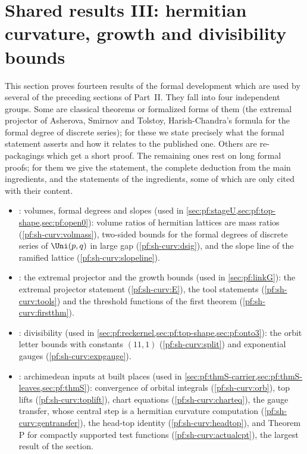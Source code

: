 \section{Shared results III: hermitian curvature, growth and divisibility bounds}\label{sec:pf:sh-curv}

\providecommand{\shcurvDs}{d_\sigma}
\providecommand{\shcurvDt}{d_\tau}
\providecommand{\shcurvGap}{h_0}
\providecommand{\shcurvRam}{\mathrm{ram}}
\providecommand{\shcurvPP}{\mathsf P}
\providecommand{\shcurvNm}{\mathfrak n^-}

This section proves fourteen results of the formal development \cite{LeanSource2026} which are used by several of the
preceding sections of Part~II. They fall into four independent groups. Some are classical theorems or formalized forms of
them (the extremal projector of Asherova, Smirnov and Tolstoy, Harish-Chandra's formula for the formal degree of discrete
series); for these we state precisely what the formal statement asserts and how it relates to the
published one. Others are re-packagings which get a short proof. The remaining ones rest on long formal proofs; for them we
give the statement, the complete deduction from the main ingredients, and the statements of the ingredients, some of which
are only cited with their content.

\begin{itemize}
\item {}: volumes, formal degrees and slopes (used in
\cref{sec:pf:stageU,sec:pf:top-shape,sec:pf:open0}): volume
ratios of hermitian lattices are mass ratios (\cref{pf:sh-curv:volmass}), two-sided bounds for the formal degrees of discrete
series of $\Uni(p,q)$ in large gap (\cref{pf:sh-curv:dsig}), and the slope line of the ramified lattice
(\cref{pf:sh-curv:slopeline}).
\item {}: the extremal projector and the growth bounds (used in \cref{sec:pf:linkG}): the extremal
projector statement (\cref{pf:sh-curv:E}), the tool statements (\cref{pf:sh-curv:tools}) and the threshold functions of the
first theorem (\cref{pf:sh-curv:firstthm}).
\item {}: divisibility (used in \cref{sec:pf:reckernel,sec:pf:top-shape,sec:pf:onto3}): the orbit
letter bounds with constants $(11,1)$ (\cref{pf:sh-curv:split}) and exponential gauges (\cref{pf:sh-curv:expgauge}).
\item {}: archimedean inputs at built places (used in
\cref{sec:pf:thmS-carrier,sec:pf:thmS-leaves,sec:pf:thmS}): convergence of orbital integrals (\cref{pf:sh-curv:orb}), top
lifts (\cref{pf:sh-curv:toplift}), chart equations (\cref{pf:sh-curv:charteq}), the gauge transfer, whose central step is a
hermitian curvature computation (\cref{pf:sh-curv:gentransfer}), the head-top identity (\cref{pf:sh-curv:headtop}), and
Theorem P for compactly supported test functions (\cref{pf:sh-curv:actualcpt}), the largest result of the section.
\end{itemize}

